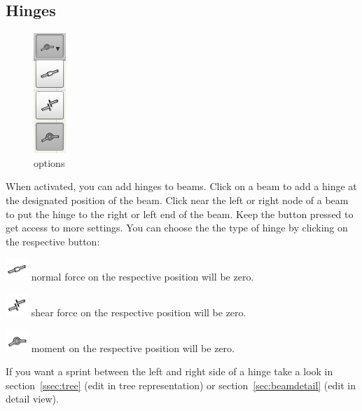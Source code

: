 \documentclass[a4paper,11pt]{report}
\begin{document}
\subsection{Hinges}

\begin{minipage}[h]{4cm}
\begin{figure}[H]
\begin{center}
\includegraphics[scale=0.6]{../pictures/hinge_opt.png}
\caption{options}
\label{pic:hinge_opt}
\end{center}
\end{figure}
\end{minipage}
\begin{minipage}[h]{\textwidth-4cm}
When activated, you can add hinges to beams. Click on a beam to add a hinge at the designated position of the beam. Click near the left or right node of a beam to put the hinge to the right or left end of the beam. Keep the button pressed to get access to more settings. You can choose the the type of hinge by clicking on the respective button:
\begin{trivlist}
	\item[] \includegraphics[scale = 0.5]{../../icons/jointN.png} normal force on the respective position will be zero.
	\item[] \includegraphics[scale = 0.5]{../../icons/jointQ.png} shear force on the respective position will be zero.
	\item[] \includegraphics[scale = 0.5]{../../icons/joint.png} moment on the respective position will be zero.
\end{trivlist}
If you want a sprint between the left and right side of a hinge take a look in section~\ref{ssec:tree} (edit in tree representation) or section~\ref{sec:beamdetail} (edit in detail view).
\end{minipage}
\end{document}
